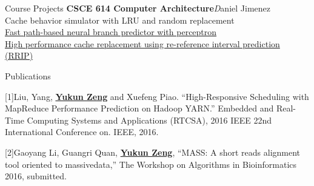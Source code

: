 \documentclass{resume} %
\newcommand{\tab}[1]{\hspace{.2667\textwidth}\rlap{#1}}
\newcommand{\itab}[1]{\hspace{0em}\rlap{#1}}
\begin{document}


\begin{rSection}{Course Projects}
{\bf CSCE 614 Computer Architecture}\hfill {\emph Daniel Jimenez}\\
Cache behavior simulator with LRU and random replacement\\
\href{https://github.com/vincenttsang/CompArch/blob/master/branch-predictor/p1-final-report/p1-final-report.pdf}{Fast path-based neural branch predictor with perceptron}\\
\href{https://github.com/vincenttsang/CompArch/blob/master/cache-replacer/p2-final-report/p2-final-report.pdf}{High performance cache replacement using re-reference interval prediction (RRIP)}
\end{rSection}

\begin{rSection}{Publications}

{[1]Liu, Yang, }\underline{\bf Yukun Zeng}{ and Xuefeng Piao. ``High-Responsive Scheduling with MapReduce Performance Prediction on Hadoop YARN.'' Embedded and Real-Time Computing Systems and Applications (RTCSA), 2016 IEEE 22nd International Conference on. IEEE, 2016.
}
\vspace*{-0.2em}

{[2]Gaoyang Li, Guangri Quan, }\underline{\bf Yukun Zeng}{, ``MASS: A short reads alignment tool oriented to massive}{data,'' The Workshop on Algorithms in Bioinformatics 2016, submitted.}

\end{rSection}
\end{document}
